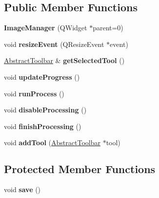 \subsection*{Public Member Functions}
\begin{DoxyCompactItemize}
\item 
{\bfseries Image\+Manager} (Q\+Widget $\ast$parent=0)\hypertarget{classImageManager_add597bba6d164dfd4dc40b4775414d48}{}\label{classImageManager_add597bba6d164dfd4dc40b4775414d48}

\item 
void {\bfseries resize\+Event} (Q\+Resize\+Event $\ast$event)\hypertarget{classImageManager_a7fd447691d098359eb7048579bdfd5d3}{}\label{classImageManager_a7fd447691d098359eb7048579bdfd5d3}

\item 
\hyperlink{classAbstractToolbar}{Abstract\+Toolbar} \& {\bfseries get\+Selected\+Tool} ()\hypertarget{classImageManager_a34d3377f775b22c2298447c81fd2dc26}{}\label{classImageManager_a34d3377f775b22c2298447c81fd2dc26}

\item 
void {\bfseries update\+Progress} ()\hypertarget{classImageManager_aec6bdbacd28f30680f03d3b66e217649}{}\label{classImageManager_aec6bdbacd28f30680f03d3b66e217649}

\item 
void {\bfseries run\+Process} ()\hypertarget{classImageManager_a71b09b8d79c52484d853738d50dea626}{}\label{classImageManager_a71b09b8d79c52484d853738d50dea626}

\item 
void {\bfseries disable\+Processing} ()\hypertarget{classImageManager_a0c3f061d23f4d93d40aa2e2138f153e6}{}\label{classImageManager_a0c3f061d23f4d93d40aa2e2138f153e6}

\item 
void {\bfseries finish\+Processing} ()\hypertarget{classImageManager_aef18f54f475d4846089485429b3d769c}{}\label{classImageManager_aef18f54f475d4846089485429b3d769c}

\item 
void {\bfseries add\+Tool} (\hyperlink{classAbstractToolbar}{Abstract\+Toolbar} $\ast$tool)\hypertarget{classImageManager_a44bd2e61708faa38ef676811f02550a9}{}\label{classImageManager_a44bd2e61708faa38ef676811f02550a9}

\end{DoxyCompactItemize}
\subsection*{Protected Member Functions}
\begin{DoxyCompactItemize}
\item 
void {\bfseries save} ()\hypertarget{classImageManager_a6e7c976a788766f38494a8ae2b9742d0}{}\label{classImageManager_a6e7c976a788766f38494a8ae2b9742d0}

\end{DoxyCompactItemize}
